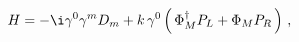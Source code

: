 \begin{equation} \label{HDirac}
H = -\i \gamma^0 \gamma^m D_m
+k \,  \gamma^0 \left(\,\Phi_M^\dagger P_L + \Phi_M P_R\,\right) \,,
\end{equation}

